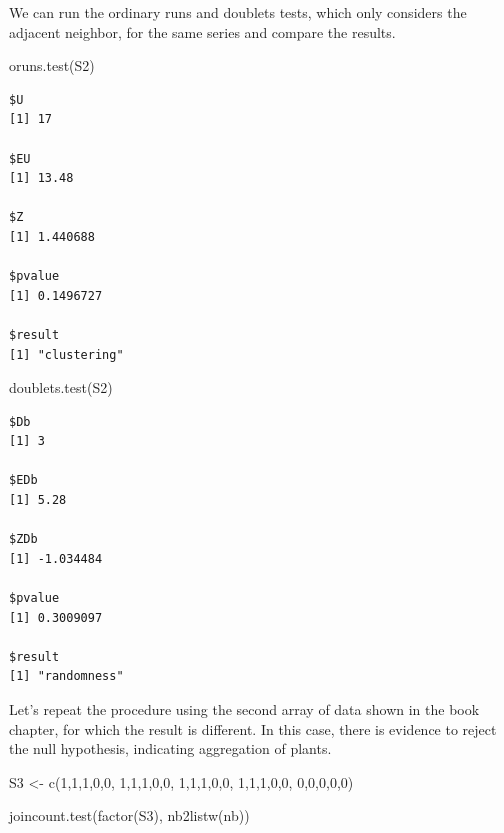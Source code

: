 \documentclass[
  letterpaper,
]{book}
\newenvironment{Shaded}{\begin{snugshade}}{\end{snugshade}}
\newcommand{\DecValTok}[1]{\textcolor[rgb]{0.68,0.00,0.00}{#1}}
\newcommand{\FunctionTok}[1]{\textcolor[rgb]{0.28,0.35,0.67}{#1}}
\newcommand{\NormalTok}[1]{\textcolor[rgb]{0.00,0.23,0.31}{#1}}
\newcommand{\OtherTok}[1]{\textcolor[rgb]{0.00,0.23,0.31}{#1}}
\begin{document}
We can run the ordinary runs and doublets tests, which only considers
the adjacent neighbor, for the same series and compare the results.

\begin{Shaded}
\begin{Highlighting}[]
\FunctionTok{oruns.test}\NormalTok{(S2)}
\end{Highlighting}
\end{Shaded}

\begin{verbatim}
$U
[1] 17

$EU
[1] 13.48

$Z
[1] 1.440688

$pvalue
[1] 0.1496727

$result
[1] "clustering"
\end{verbatim}

\begin{Shaded}
\begin{Highlighting}[]
\FunctionTok{doublets.test}\NormalTok{(S2)}
\end{Highlighting}
\end{Shaded}

\begin{verbatim}
$Db
[1] 3

$EDb
[1] 5.28

$ZDb
[1] -1.034484

$pvalue
[1] 0.3009097

$result
[1] "randomness"
\end{verbatim}

Let's repeat the procedure using the second array of data shown in the
book chapter, for which the result is different. In this case, there is
evidence to reject the null hypothesis, indicating aggregation of
plants.

\begin{Shaded}
\begin{Highlighting}[]
\NormalTok{S3 }\OtherTok{\textless{}{-}} \FunctionTok{c}\NormalTok{(}\DecValTok{1}\NormalTok{,}\DecValTok{1}\NormalTok{,}\DecValTok{1}\NormalTok{,}\DecValTok{0}\NormalTok{,}\DecValTok{0}\NormalTok{,}
       \DecValTok{1}\NormalTok{,}\DecValTok{1}\NormalTok{,}\DecValTok{1}\NormalTok{,}\DecValTok{0}\NormalTok{,}\DecValTok{0}\NormalTok{,}
       \DecValTok{1}\NormalTok{,}\DecValTok{1}\NormalTok{,}\DecValTok{1}\NormalTok{,}\DecValTok{0}\NormalTok{,}\DecValTok{0}\NormalTok{,}
       \DecValTok{1}\NormalTok{,}\DecValTok{1}\NormalTok{,}\DecValTok{1}\NormalTok{,}\DecValTok{0}\NormalTok{,}\DecValTok{0}\NormalTok{,}
       \DecValTok{0}\NormalTok{,}\DecValTok{0}\NormalTok{,}\DecValTok{0}\NormalTok{,}\DecValTok{0}\NormalTok{,}\DecValTok{0}\NormalTok{)}

\FunctionTok{joincount.test}\NormalTok{(}\FunctionTok{factor}\NormalTok{(S3), }
                \FunctionTok{nb2listw}\NormalTok{(nb))}
\end{Highlighting}
\end{Shaded}
\end{document}
